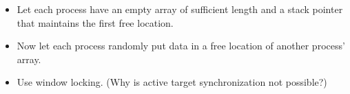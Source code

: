   \label{ex:onesidedbuild}
  \begin{itemize}
  \item
    Let each process have an empty array of sufficient length and a
    stack pointer that maintains the first free location.
  \item
    Now let each process randomly put data in a free location of another
    process' array.
  \item Use window locking. (Why is active target synchronization not possible?)
  \end{itemize}
